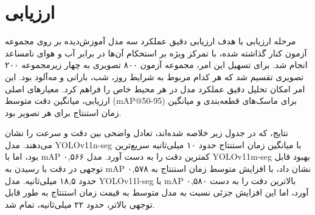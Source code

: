 \documentclass[oneside]{report}
\begin{document}
\chapter{ارزیابی}
مرحله ارزیابی با هدف ارزیابی دقیق عملکرد سه مدل آموزش‌دیده بر روی مجموعه آزمون کنار گذاشته شده، با تمرکز ویژه بر استحکام آن‌ها در برابر آب و هوای نامساعد انجام شد. برای تسهیل این امر، مجموعه آزمون ۸۰۰ تصویری به چهار زیرمجموعه ۲۰۰ تصویری تقسیم شد که هر کدام مربوط به شرایط روز، شب، بارانی و مه‌آلود بود. این امر امکان تحلیل دقیق عملکرد مدل در هر محیط خاص را فراهم کرد. معیارهای اصلی ارزیابی، میانگین دقت متوسط (mAP@50-95) برای ماسک‌های قطعه‌بندی و میانگین زمان استنتاج برای هر تصویر بود.

نتایج، که در جدول زیر خلاصه شده‌اند، تعادل واضحی بین دقت و سرعت را نشان می‌دهند. مدل YOLOv11n-seg با میانگین زمان استنتاج حدود ۱۰ میلی‌ثانیه سریع‌ترین بود، اما با mAP ۰,۵۶۶ کمترین دقت را به دست آورد. مدل YOLOv11m-seg بهبود قابل توجهی در دقت با رسیدن به mAP ۰,۵۷۸ نشان داد، با افزایش متوسط زمان استنتاج به حدود ۱۸,۵ میلی‌ثانیه. مدل YOLOv11l-seg با mAP ۰,۵۸۰ بالاترین دقت را به دست آورد، اما این افزایش جزئی نسبت به مدل متوسط به قیمت زمان استنتاج به طور قابل توجهی بالاتر، حدود ۲۲ میلی‌ثانیه، تمام شد.
\end{document}
